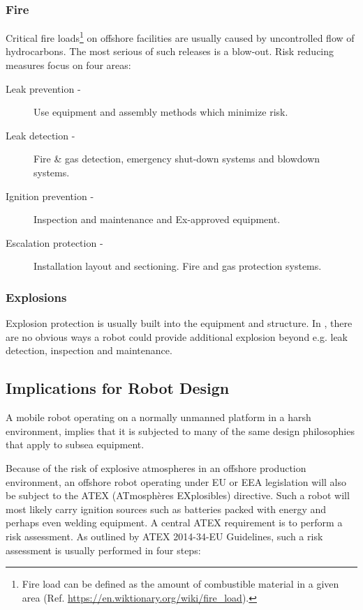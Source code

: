 \subsubsection{Fire}

Critical fire loads\footnote{Fire load can be defined as the amount of combustible material in a given area (Ref. \url{https://en.wiktionary.org/wiki/fire_load}).} on offshore facilities are usually caused by uncontrolled flow of hydrocarbons. The most serious of such releases is a blow-out. Risk reducing measures focus on four areas\cite{Vinnem2014}: 

\begin{description}
\item[Leak prevention - ] Use equipment and assembly methods which minimize risk.

\item[Leak detection - ]  Fire \& gas detection, emergency shut-down systems and blowdown systems.

\item[Ignition prevention -] Inspection and maintenance and Ex-approved equipment.

\item[Escalation protection  -] Installation layout and sectioning. Fire and gas protection systems.
\end{description}


\subsubsection{Explosions}

Explosion protection is usually built into the equipment and structure. In \cite{Vinnem2014}, there are no obvious ways a robot could provide additional explosion beyond e.g. leak detection, inspection and maintenance. 

\subsection{Implications for Robot Design}

A mobile robot operating on a normally unmanned platform in a harsh environment, implies that it is subjected to many of the same design philosophies that apply to subsea equipment. 

Because of the risk of explosive atmospheres in an offshore production environment, an offshore robot operating under EU or EEA legislation will also be subject to the ATEX (ATmosphères EXplosibles) directive. Such a robot will most likely carry ignition sources such as batteries packed with energy and perhaps even welding equipment. A central ATEX requirement is to perform a risk assessment. As outlined by ATEX 2014-34-EU Guidelines\cite{ATEX_guidelines}, such a risk assessment is usually performed in four steps:

